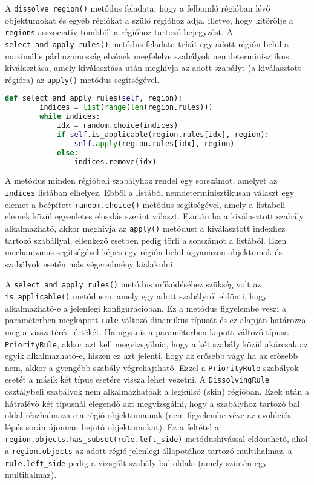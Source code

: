 A \verb|dissolve_region()| metódus feladata, hogy a felbomló régióban lévő objektumokat és egyéb régiókat a szülő régióhoz adja, illetve, hogy kitörölje a \verb|regions| asszociatív tömbből a régióhoz tartozó bejegyzést.
A \verb|select_and_apply_rules()| metódus feladata tehát egy adott régión belül a maximális párhuzamosság elvének megfelelve szabályok nemdeterminisztikus kiválasztása, amely kiválasztása után meghívja az adott szabályt (a kiválasztott régióra) az \verb|apply()| metódus segítségével.

\begin{lstlisting}[language={Python}]
 def select_and_apply_rules(self, region):
        indices = list(range(len(region.rules)))
        while indices:
            idx = random.choice(indices)
            if self.is_applicable(region.rules[idx], region):
                self.apply(region.rules[idx], region)
            else:
                indices.remove(idx)	
\end{lstlisting}

A metódus minden régióbeli szabályhoz rendel egy sorszámot, amelyet az \verb|indices| listában elhelyez. Ebből a listából nemdeterminisztikusan választ egy elemet a beépített \verb|random.choice()| metódus segítségével, amely a listabeli elemek közül egyenletes eloszlás szerint választ. Ezután ha a kiválasztott szabály alkalmazható, akkor meghívja az \verb|apply()| metódust a kiválasztott indexhez tartozó szabállyal, ellenkező esetben pedig törli a sorszámot a listából. Ezen mechanizmus segítségével képes egy régión belül ugyanazon objektumok és szabályok esetén más végeredmény kialakulni. 
 
 A \verb|select_and_apply_rules()| metódus működéséhez szükség volt az \verb|is_applicable()| metódusra, amely egy adott szabályról eldönti, hogy alkalmazható-e a jelenlegi konfigurációban.
 Ez a metódus figyelembe veszi a paraméterben megkapott \verb|rule| változó dinamikus típusát és ez alapján határozza meg a visszatérési értékét. Ha ugyanis a paraméterben kapott változó típusa \verb|PriorityRule|, akkor azt kell megvizsgálnia, hogy a két szabály közül akárcsak az egyik alkalmazható-e, hiszen ez azt jelenti, hogy az erősebb vagy ha az erősebb nem, akkor a gyengébb szabály végrehajtható. Ezzel a \verb|PriorityRule| szabályok esetét a másik két típus esetére vissza lehet vezetni. A \verb|DissolvingRule| osztálybeli szabályok nem alkalmazhatóak a legkülső (skin) régióban. Ezek után a hátralévő két típusnál elegendő azt megvizsgálni, hogy a szabályhoz tartozó bal oldal részhalmaza-e a régió objektumainak (nem figyelembe véve az evolúciós lépés során újonnan bejutó objektumokat). 
 Ez a feltétel a \verb|region.objects.has_subset(rule.left_side)| metódushívással eldönthető, ahol a \verb|region.objects| az adott régió jelenlegi állapotához tartozó multihalmaz, a \verb|rule.left_side| pedig a vizsgált szabály bal oldala (amely szintén egy multihalmaz).

